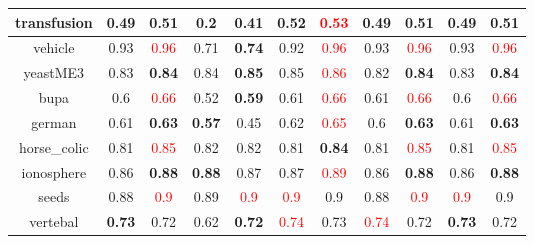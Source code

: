 \documentclass{article}%
\begin{document}
\begin{tabular}{c|cccccccccc}
transfusion&0.49&\textbf{0.51}&0.2&\textbf{0.41}&0.52&\textcolor{red}{ 
0.53
}&0.49&\textbf{0.51}&0.49&\textbf{0.51}\\%
\hline%
vehicle&0.93&\textcolor{red}{ 
0.96
}&0.71&\textbf{0.74}&0.92&\textcolor{red}{ 
0.96
}&0.93&\textcolor{red}{ 
0.96
}&0.93&\textcolor{red}{ 
0.96
}\\%
\hline%
yeastME3&0.83&\textbf{0.84}&0.84&\textbf{0.85}&0.85&\textcolor{red}{ 
0.86
}&0.82&\textbf{0.84}&0.83&\textbf{0.84}\\%
\hline%
bupa&0.6&\textcolor{red}{ 
0.66
}&0.52&\textbf{0.59}&0.61&\textcolor{red}{ 
0.66
}&0.61&\textcolor{red}{ 
0.66
}&0.6&\textcolor{red}{ 
0.66
}\\%
\hline%
german&0.61&\textbf{0.63}&\textbf{0.57}&0.45&0.62&\textcolor{red}{ 
0.65
}&0.6&\textbf{0.63}&0.61&\textbf{0.63}\\%
\hline%
horse\_colic&0.81&\textcolor{red}{ 
0.85
}&0.82&0.82&0.81&\textbf{0.84}&0.81&\textcolor{red}{ 
0.85
}&0.81&\textcolor{red}{ 
0.85
}\\%
\hline%
ionosphere&0.86&\textbf{0.88}&\textbf{0.88}&0.87&0.87&\textcolor{red}{ 
0.89
}&0.86&\textbf{0.88}&0.86&\textbf{0.88}\\%
\hline%
seeds&0.88&\textcolor{red}{ 
0.9
}&0.89&\textcolor{red}{ 
0.9
}&\textcolor{red}{ 
0.9
}&0.9&0.88&\textcolor{red}{ 
0.9
}&\textcolor{red}{ 
0.9
}&0.9\\%
\hline%
vertebal&\textbf{0.73}&0.72&0.62&\textbf{0.72}&\textcolor{red}{ 
0.74
}&0.73&\textcolor{red}{ 
0.74
}&0.72&\textbf{0.73}&0.72\\%
\hline%
\end{tabular}

%
\end{document}
